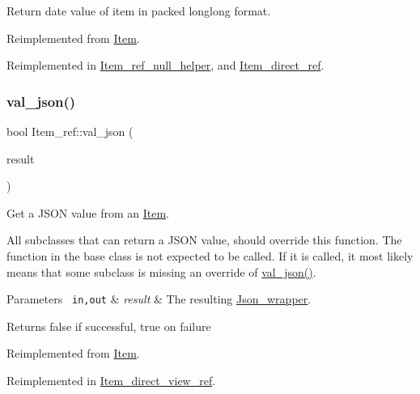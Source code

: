 Return date value of item in packed longlong format. 

Reimplemented from \mbox{\hyperlink{classItem_a9174217a46706eb2db74689b5365c4a5}{Item}}.



Reimplemented in \mbox{\hyperlink{classItem__ref__null__helper_ae8e303c9b0015a81a80607ff31cdf57e}{Item\+\_\+ref\+\_\+null\+\_\+helper}}, and \mbox{\hyperlink{classItem__direct__ref_a10fdb82072009fd9bc88657cbc49f282}{Item\+\_\+direct\+\_\+ref}}.

\mbox{\label{classItem__ref_ab7fe1fd26301ae6f9692105dc06403f1}} 
\subsubsection{\texorpdfstring{val\+\_\+json()}{val\_json()}}
{\footnotesize\ttfamily bool Item\+\_\+ref\+::val\+\_\+json (\begin{DoxyParamCaption}\item[{\mbox{\hyperlink{classJson__wrapper}{Json\+\_\+wrapper}} $\ast$}]{result }\end{DoxyParamCaption})\hspace{0.3cm}{\ttfamily [virtual]}}

Get a J\+S\+ON value from an \mbox{\hyperlink{classItem}{Item}}.

All subclasses that can return a J\+S\+ON value, should override this function. The function in the base class is not expected to be called. If it is called, it most likely means that some subclass is missing an override of \mbox{\hyperlink{classItem__ref_ab7fe1fd26301ae6f9692105dc06403f1}{val\+\_\+json()}}.


\begin{DoxyParams}[1]{Parameters}
\mbox{\texttt{ in,out}}  & {\em result} & The resulting \mbox{\hyperlink{classJson__wrapper}{Json\+\_\+wrapper}}.\\
\hline
\end{DoxyParams}
\begin{DoxyReturn}{Returns}
false if successful, true on failure 
\end{DoxyReturn}


Reimplemented from \mbox{\hyperlink{classItem_a57e763fcde2d0a819d21e31c59611290}{Item}}.



Reimplemented in \mbox{\hyperlink{classItem__direct__view__ref_a4b28cab9b54ffdfe277bd2c26cb50709}{Item\+\_\+direct\+\_\+view\+\_\+ref}}.

